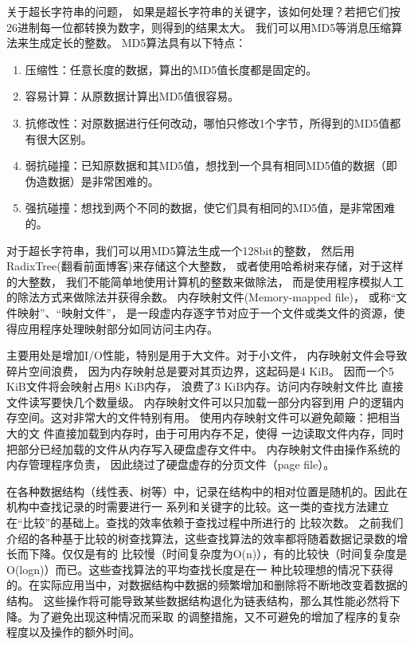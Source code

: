 关于超长字符串的问题，
如果是超长字符串的关键字，该如何处理？若把它们按26进制每一位都转换为数字，则得到的结果太大。
我们可以用MD5等消息压缩算法来生成定长的整数。
MD5算法具有以下特点：
\begin{enumerate}
	\item 压缩性：任意长度的数据，算出的MD5值长度都是固定的。
\item 容易计算：从原数据计算出MD5值很容易。
\item 抗修改性：对原数据进行任何改动，哪怕只修改1个字节，所得到的MD5值都有很大区别。
\item 弱抗碰撞：已知原数据和其MD5值，想找到一个具有相同MD5值的数据（即伪造数据）是非常困难的。
\item 强抗碰撞：想找到两个不同的数据，使它们具有相同的MD5值，是非常困难的。
\end{enumerate}
对于超长字符串，我们可以用MD5算法生成一个128bit的整数，
然后用RadixTree(翻看前面博客)来存储这个大整数，
或者使用哈希树来存储，对于这样的大整数，
我们不能简单地使用计算机的整数来做除法，
而是使用程序模拟人工的除法方式来做除法并获得余数。
内存映射文件(Memory-mapped file)，
或称“文件映射”、“映射文件”，
是一段虚内存逐字节对应于一个文件或类文件的资源，使得应用程序处理映射部分如同访问主内存。

主要用处是增加I/O性能，特别是用于大文件。对于小文件，
内存映射文件会导致碎片空间浪费，
因为内存映射总是要对其页边界，这起码是4 KiB。
因而一个5 KiB文件将会映射占用8 KiB内存，
浪费了3 KiB内存。访问内存映射文件比
直接文件读写要快几个数量级。
内存映射文件可以只加载一部分内容到用
户的逻辑内存空间。这对非常大的文件特别有用。
使用内存映射文件可以避免颠簸：把相当大的文
件直接加载到内存时，由于可用内存不足，使得
一边读取文件内存，同时把部分已经加载的文件从内存写入硬盘虚存文件中。
内存映射文件由操作系统的内存管理程序负责，
因此绕过了硬盘虚存的分页文件（page file）。

在各种数据结构（线性表、树等）中，记录在结构中的相对位置是随机的。因此在机构中查找记录的时需要进行一
系列和关键字的比较。这一类的查找方法建立在“比较”的基础上。查找的效率依赖于查找过程中所进行的
比较次数。
之前我们介绍的各种基于比较的树查找算法，这些查找算法的效率都将随着数据记录数的增长而下降。仅仅是有的
比较慢（时间复杂度为O(n)），有的比较快（时间复杂度是O(logn)）而已。这些查找算法的平均查找长度是在一
种比较理想的情况下获得的。在实际应用当中，对数据结构中数据的频繁增加和删除将不断地改变着数据的结构。
这些操作将可能导致某些数据结构退化为链表结构，那么其性能必然将下降。为了避免出现这种情况而采取
的调整措施，又不可避免的增加了程序的复杂程度以及操作的额外时间。

